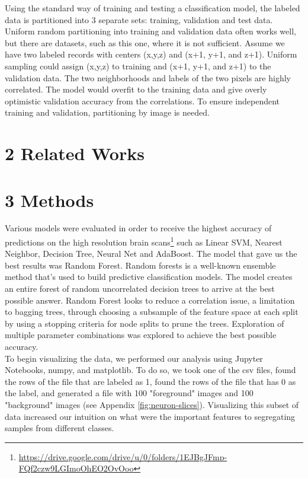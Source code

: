 \documentclass{neu_handout}
\begin{document}
Using the standard way of training and testing a classification model, the labeled data is partitioned into 3 separate sets: training, validation and test data. Uniform random partitioning into training and validation data often works well, but there are datasets, such as this one, where it is not sufficient. Assume we have two labeled records with centers (x,y,z) and (x+1, y+1, and z+1). Uniform sampling could assign (x,y,z) to training and (x+1, y+1, and z+1) to the validation data. The two neighborhoods and labels of the two pixels are highly correlated. The model would overfit to the training data and give overly optimistic validation accuracy from the correlations. To ensure independent training and validation, partitioning by image is needed.

\section*{2 Related Works}

\section*{3 Methods}
Various models were evaluated in order to receive the highest accuracy of predictions on the high resolution brain scans\footnote{\url{https://drive.google.com/drive/u/0/folders/1EJBgJFmp-FQf2czw9LGImoOhEO2OvOoo}} such as Linear SVM, Nearest Neighbor, Decision Tree, Neural Net and AdaBoost. The model that gave us the best results was Random Forest. Random forests is a well-known ensemble method that's used to build predictive classification models. The model creates an entire forest of random uncorrelated decision trees to arrive at the best possible answer. Random Forest looks to reduce a correlation issue, a limitation to bagging trees, through choosing a subsample of the feature space at each split by using a stopping criteria for node splits to prune the trees. Exploration of multiple parameter combinations was explored to achieve the best possible accuracy. \\

To begin visualizing the data, we performed our analysis using Jupyter Notebooks, numpy, and matplotlib. To do so, we took one of the csv files, found the rows of the file that are labeled as 1, found the rows of the file that has 0 as the label, and generated a file with 100 "foreground" images and 100 "background" images (see Appendix \ref{fig:neuron-slices}). Visualizing this subset of data increased our intuition on what were the important features to segregating samples from different classes.
\end{document}
